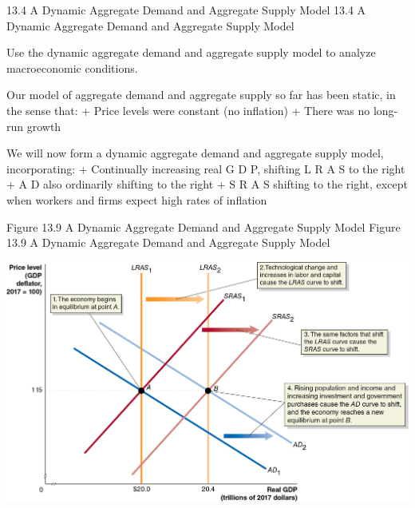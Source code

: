 \documentclass[
  12pt,
  ignorenonframetext,
]{beamer}
\begin{document}
\begin{frame}{13.4 A Dynamic Aggregate Demand and Aggregate Supply
Model}
\protect\hypertarget{a-dynamic-aggregate-demand-and-aggregate-supply-model}{}
13.4 A Dynamic Aggregate Demand and Aggregate Supply Model

Use the dynamic aggregate demand and aggregate supply model to analyze
macroeconomic conditions.

Our model of aggregate demand and aggregate supply so far has been
static, in the sense that: + Price levels were constant (no inflation) +
There was no long-run growth

We will now form a dynamic aggregate demand and aggregate supply model,
incorporating: + Continually increasing real G D P, shifting L R A S to
the right + A D also ordinarily shifting to the right + S R A S shifting
to the right, except when workers and firms expect high rates of
inflation
\end{frame}

\begin{frame}{Figure 13.9 A Dynamic Aggregate Demand and Aggregate
Supply Model}
\protect\hypertarget{figure-13.9-a-dynamic-aggregate-demand-and-aggregate-supply-model}{}
Figure 13.9 A Dynamic Aggregate Demand and Aggregate Supply Model

\includegraphics[width=\textwidth,height=0.99\textheight]{imgs3/img_slide45a.png}
\end{frame}
\end{document}
